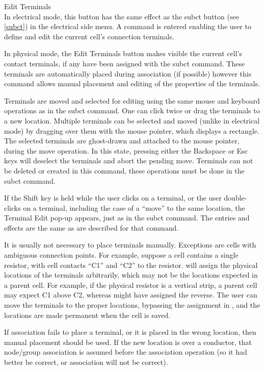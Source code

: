 \begin{description}
\item{\cb Edit Terminals}\\
In electrical mode, this button has the same effect as the {\cb subct}
button (see \ref{subct}) in the electrical side menu.  A command is
entered enabling the user to define and edit the current cell's
connection terminals.

In physical mode, the {\cb Edit Terminals} button makes visible the
current cell's contact terminals, if any have been assigned with the
{\cb subct} command.  These terminals are automatically placed during
association (if possible) however this command allows manual placement
and editing of the properties of the terminals.

Terminals are moved and selected for editing using the same mouse and
keyboard operations as in the {\cb subct} command.  One can click
twice or drag the terminals to a new location.  Multiple terminals can
be selected and moved (unlike in electrical mode) by dragging over
them with the mouse pointer, which displays a rectangle.  The selected
terminals are ghost-drawn and attached to the mouse pointer, during
the move operation.  In this state, pressing either the {\kb
Backspace} or {\kb Esc} keys will deselect the terminals and abort the
pending move.  Terminals can not be deleted or created in this
command, these operations must be done in the {\cb subct} command.

If the {\kb Shift} key is held while the user clicks on a terminal, or
the user double-clicks on a terminal, including the case of a ``move''
to the same location, the {\cb Terminal Edit} pop-up appears, just as
in the {\cb subct} command.  The entries and effects are the same as
are described for that command.

It is usually not necessary to place terminals manually.  Exceptions
are cells with ambiguous connection points.  For example, suppose a
cell contains a single resistor, with cell contacts ``C1'' and ``C2''
to the resistor.  {\Xic} will assign the physical locations of the
terminals arbitrarily, which may not be the locations expected in a
parent cell.  For example, if the physical resistor is a vertical
strip, a parent cell may expect C1 above C2, whereas {\Xic} might have
assigned the reverse.  The user can move the terminals to the proper
locations, bypassing the assignment in {\Xic}, and the locations are
made permanent when the cell is saved.

If association fails to place a terminal, or it is placed in the wrong
location, then manual placement should be used.  If the new location
is over a conductor, that node/group association is assumed before the
association operation (so it had better be correct, or association
will not be correct).


\end{description}
